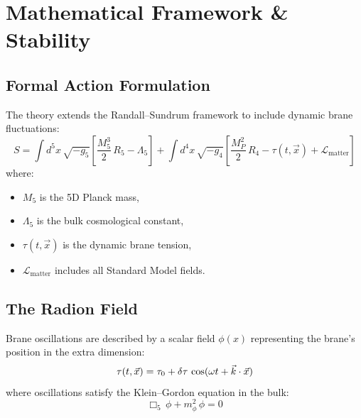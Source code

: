 
\chapter{Mathematical Framework \& Stability}
\label{ch:mathematical}

\section{Formal Action Formulation}
\label{sec:action}

The theory extends the Randall--Sundrum framework to include dynamic brane fluctuations:
\begin{equation}
S = \int d^5x\,\sqrt{-g_5}\left[\frac{M_5^3}{2}\,R_5 - \Lambda_5\right]
+ \int d^4x\,\sqrt{-g_4}\left[\frac{M_P^2}{2}\,R_4 - \tau(t,\vec{x}) + \mathcal{L}_\text{matter}\right]
\end{equation}
where:
\begin{itemize}
  \item $M_5$ is the 5D Planck mass,
  \item $\Lambda_5$ is the bulk cosmological constant,
  \item $\tau(t,\vec{x})$ is the dynamic brane tension,
  \item $\mathcal{L}_\text{matter}$ includes all Standard Model fields.
\end{itemize}

\section{The Radion Field}
\label{sec:radion}

Brane oscillations are described by a scalar field $\phi(x)$ representing the brane's position in the extra dimension:
\begin{equation}
\tau(t,\vec{x}) = \tau_0 + \delta\tau\,\cos(\omega t + \vec{k}\cdot\vec{x})
\end{equation}
where oscillations satisfy the Klein--Gordon equation in the bulk:
\begin{equation}
\Box_5\,\phi + m_\phi^2\,\phi = 0
\end{equation}

